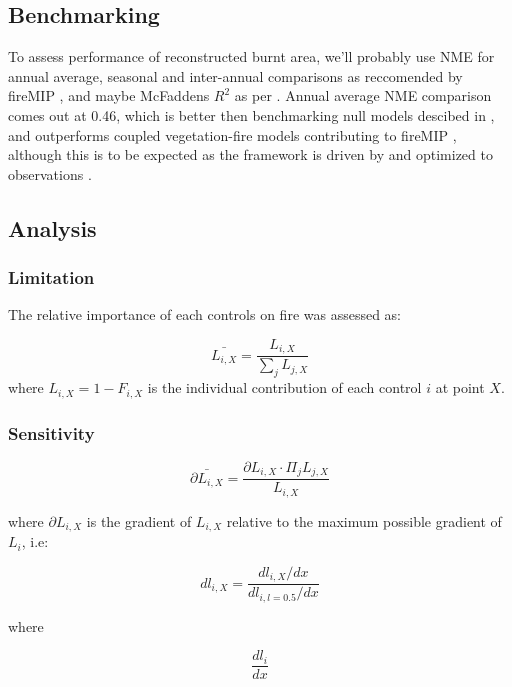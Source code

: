 \subsection{Benchmarking}
\begin{shaded}
To assess performance of reconstructed burnt area, we'll probably use NME for annual average, seasonal and inter-annual comparisons \citep{kelley2013comprehensive} as reccomended by fireMIP \citet{gmd-2016-237, hantson2016status}, and maybe McFaddens $R^{2}$ as per \citep{bistinas2014causal}. Annual average NME comparison comes out at 0.46, which is better then benchmarking null models descibed in \citet{kelley2013comprehensive}, and outperforms coupled vegetation-fire models contributing to fireMIP \citep{hantson2016status}, although this is to be expected as the framework is driven by and optimized to observations \citep{kelley2013comprehensive}.
\end{shaded}
\subsection{Analysis}


\subsubsection{Limitation}

The relative importance of each controls on fire was assessed as:

\begin{equation}
    \bar{L_{i, X}} = \frac{L_{i, X}}{\sum_{j} L_{j, X}}
\end{equation}
where $L_{i, X} = 1 - F_{i,X}$ is the individual contribution of each control $i$ at point $X$.

\subsubsection{Sensitivity}

\begin{equation}
    \bar{\partial L_{i, X}} = \frac{\partial L_{i, X} \cdot \Pi_{j} L_{j, X}}{L_{i, X}}
\end{equation}

where $\partial L_{i, X}$ is the gradient of $L_{i, X}$ relative to the maximum possible gradient of $L_{i}$, i.e:

\begin{equation}
    dl_{i, X} = \frac{dl_{i, X} / dx}{dl_{i, l = 0.5} / dx}
\end{equation}

where

\begin{equation}
    \frac{dl_{i}}{dx}
\end{equation}
